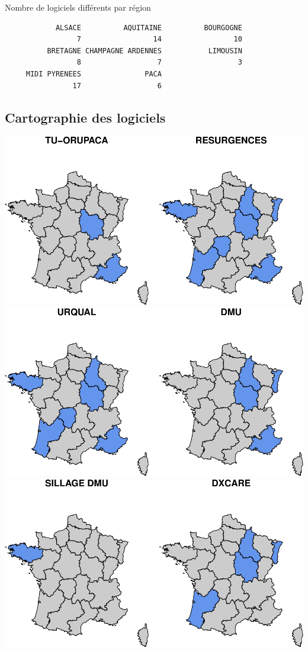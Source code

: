 \documentclass[]{article}
\begin{document}
Nombre de logiciels différents par région

\begin{verbatim}
            ALSACE          AQUITAINE          BOURGOGNE 
                 7                 14                 10 
          BRETAGNE CHAMPAGNE ARDENNES           LIMOUSIN 
                 8                  7                  3 
     MIDI PYRENEES               PACA 
                17                  6 
\end{verbatim}

\subsection{Cartographie des
logiciels}\label{cartographie-des-logiciels}

\includegraphics{septembre2015_files/figure-latex/unnamed-chunk-8-1.pdf}
\includegraphics{septembre2015_files/figure-latex/unnamed-chunk-8-2.pdf}
\includegraphics{septembre2015_files/figure-latex/unnamed-chunk-8-3.pdf}
\end{document}
